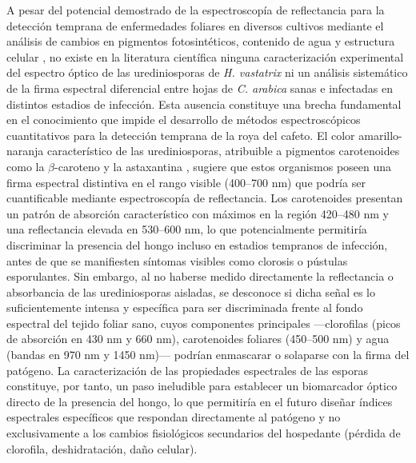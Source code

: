 \documentclass[12pt, a4paper]{article}
\begin{document}
	A pesar del potencial demostrado de la espectroscopía de reflectancia para la detección temprana de enfermedades foliares en diversos cultivos mediante el análisis de cambios en pigmentos fotosintéticos, contenido de agua y estructura celular \parencite{Mahlein2016, Gold2020}, no existe en la literatura científica ninguna caracterización experimental del espectro óptico de las urediniosporas de \textit{H. vastatrix} ni un análisis sistemático de la firma espectral diferencial entre hojas de \textit{C. arabica} sanas e infectadas en distintos estadios de infección. Esta ausencia constituye una brecha fundamental en el conocimiento que impide el desarrollo de métodos espectroscópicos cuantitativos para la detección temprana de la roya del cafeto. El color amarillo-naranja característico de las urediniosporas, atribuible a pigmentos carotenoides como la $\beta$-caroteno y la astaxantina \parencite{Britton1995}, sugiere que estos organismos poseen una firma espectral distintiva en el rango visible (400–700 nm) que podría ser cuantificable mediante espectroscopía de reflectancia. Los carotenoides presentan un patrón de absorción característico con máximos en la región 420–480 nm y una reflectancia elevada en 530–600 nm, lo que potencialmente permitiría discriminar la presencia del hongo incluso en estadios tempranos de infección, antes de que se manifiesten síntomas visibles como clorosis o pústulas esporulantes. Sin embargo, al no haberse medido directamente la reflectancia o absorbancia de las urediniosporas aisladas, se desconoce si dicha señal es lo suficientemente intensa y específica para ser discriminada frente al fondo espectral del tejido foliar sano, cuyos componentes principales —clorofilas (picos de absorción en 430 nm y 660 nm), carotenoides foliares (450–500 nm) y agua (bandas en 970 nm y 1450 nm)— podrían enmascarar o solaparse con la firma del patógeno. La caracterización de las propiedades espectrales de las esporas constituye, por tanto, un paso ineludible para establecer un biomarcador óptico directo de la presencia del hongo, lo que permitiría en el futuro diseñar índices espectrales específicos que respondan directamente al patógeno y no exclusivamente a los cambios fisiológicos secundarios del hospedante (pérdida de clorofila, deshidratación, daño celular). 
	
\end{document}
